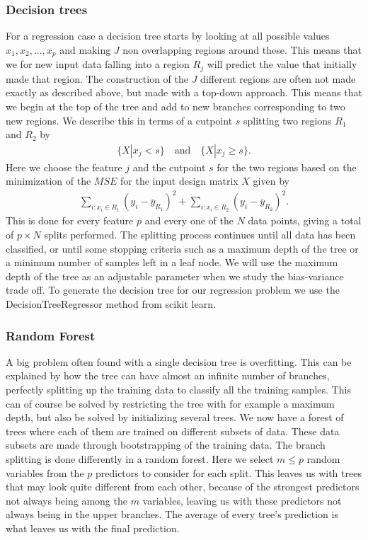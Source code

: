\documentclass[11pt]{article}
\begin{document}
\subsubsection*{Decision trees}
For a regression case a decision tree starts by looking at all possible values $x_1,x_2,...,x_p$ and making $J$ non overlapping regions around these. This means that we for new input data falling into a region $R_j$ will predict the value that initially made that region. The construction of the $J$ different regions are often not made exactly as described above, but made with a top-down approach. This means that we begin at the top of the tree and add to new branches corresponding to two new regions. We describe this in terms of a cutpoint $s$ splitting two regions $R_1$ and $R_2$ by
\begin{align*}
    \{X|x_j < s\} \quad\text{and}\quad \{X|x_j \geq s\}.
\end{align*}
Here we choose the feature $j$ and the cutpoint $s$ for the two regions based on the minimization of the $MSE$ for the input design matrix $X$ given by
\begin{align*}
    \sum_{i:x_i \in R_1} (y_i - \overline{y}_{R_1})^2  + \sum_{i:x_i \in R_2} (y_i - \overline{y}_{R_2})^2.
\end{align*}
This is done for every feature $p$ and every one of the $N$ data points, giving a total of $p \times N $ splits performed. The splitting process continues until all data has been classified, or until some stopping criteria such as a maximum depth of the tree or a minimum number of samples left in a leaf node. We will use the maximum depth of the tree as an adjustable parameter when we study the bias-variance trade off. To generate the decision tree for our regression problem we use the DecisionTreeRegressor method from scikit learn.

\subsubsection*{Random Forest}
A big problem often found with a single decision tree is overfitting. This can be explained by how the tree can have almost an infinite number of branches, perfectly splitting up the training data to classify all the training samples. This can of course be solved by restricting the tree with for example a maximum depth, but also be solved by initializing several trees. We now have a forest of trees where each of them are trained on different subsets of data. These data subsets are made through bootstrapping of the training data. The branch splitting is done differently in a random forest. Here we select $m \leq p$ random variables from the $p$ predictors to consider for each split. This leaves us with trees that may look quite different from each other, because of the strongest predictors not always being among the $m$ variables, leaving us with these predictors not always being in the upper branches. The average of every tree's prediction is what leaves us with the final prediction.
\end{document}
